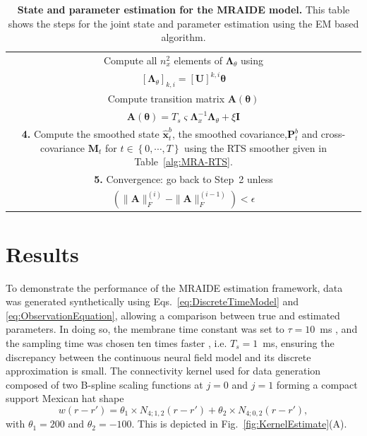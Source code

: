 \documentclass[review,authoryear,3p]{elsarticle}
\begin{document}
\begin{table}[!ht]
\begin{tabular}{|c|}
\multicolumn{1}{|p{16cm}|}{Compute all $n_x^2$ elements of $\boldsymbol\Lambda_{\theta}$ using} \\
$\left[ \boldsymbol\Lambda_{\theta}\right] _{k,i}=\left[ \mathbf U\right]^{k,i}\boldsymbol\theta$\\
\multicolumn{1}{|p{16cm}|}{Compute transition matrix $\mathbf A(\boldsymbol\theta)$ } \\
$\mathbf A(\boldsymbol \theta) = T_s\varsigma\mathbf{\Lambda}_{x}^{-1}\mathbf{\Lambda}_{\theta}+\xi\mathbf I$\\
\hline
\multicolumn{1}{|p{16cm}|}{\textbf{4.} Compute the smoothed state $\hat{\mathbf x}_t^b$, the smoothed covariance,$\mathbf P^b_t$ and cross-covariance $\mathbf M_t$ for $t\in\left\lbrace 0,\cdots,T\right\rbrace $ using the RTS smoother given in Table~\ref{alg:MRA-RTS}.}\\  
\hline
\multicolumn{1}{|p{16cm}|}{\textbf{5.} Convergence: go back to Step~2 unless }\\
$ \left(\parallel \mathbf{A} \parallel_{F}^{(i)}-\parallel \mathbf{A} \parallel_{F}^{(i-1)}\right)<\epsilon$\\
\hline
\end{tabular}
\caption{\textbf{State and parameter estimation for the MRAIDE model.} This table shows the steps for the joint state and parameter estimation using the EM based algorithm.}
\label{alg:EMsteps}
\end{table}
\renewcommand{\arraystretch}{1}
\section{Results}\label{sec:MRA-results}
To demonstrate the performance of the MRAIDE estimation framework, data was generated synthetically  using Eqs.~\eqref{eq:DiscreteTimeModel} and \eqref{eq:ObservationEquation}, allowing a comparison between true and estimated parameters. In doing so, the membrane time constant was set to $\tau = 10$~ms \citep{David2003}, and the sampling time was chosen ten times faster \citep{Stephan2008}, i.e. $T_s = 1$~ms, ensuring the discrepancy between the continuous neural field model and its discrete approximation is small. The connectivity kernel used for data generation composed of two B-spline scaling functions at $j=0$ and $j=1$ forming a compact support Mexican hat shape 
\begin{equation}\label{eq:ConnectivityKernelForData}
	w(r-r')=\theta_1\times N_{4;1,2}(r-r')+\theta_2\times N_{4;0,2}(r-r'),
\end{equation}
with $\theta_1=200$ and $\theta_2=-100$. This is depicted in Fig.~\ref{fig:KernelEstimate}(A).
\end{document}
